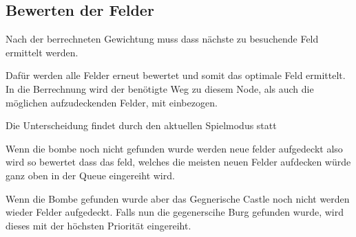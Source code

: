 \subsection{Bewerten der Felder}
Nach der berrechneten Gewichtung muss dass nächste zu besuchende Feld ermittelt werden.

Dafür werden alle Felder erneut bewertet und somit das optimale Feld ermittelt. In die Berrechnung wird der benötigte Weg zu diesem Node, als auch die möglichen aufzudeckenden Felder, mit einbezogen.

Die Unterscheidung findet durch den aktuellen Spielmodus statt

Wenn die bombe noch nicht gefunden wurde werden neue felder aufgedeckt also wird so bewertet dass das feld, welches die meisten neuen Felder aufdecken würde ganz oben in der Queue eingereiht wird.

Wenn die Bombe gefunden wurde aber das Gegnerische Castle noch nicht werden wieder Felder aufgedeckt. Falls nun die gegenerscihe Burg gefunden wurde, wird dieses mit der höchsten Priorität eingereiht.

